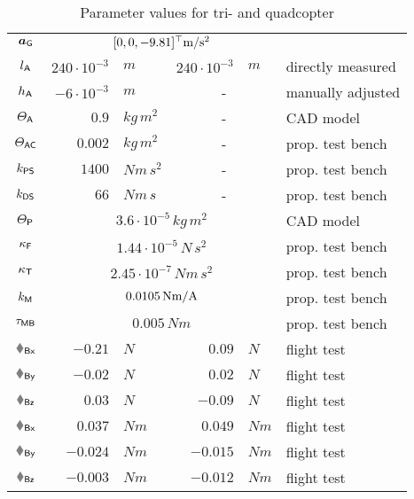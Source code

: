 \begin{table}
\begin{tabular}{crlrll}
  \\[1ex]
  $\boldsymbol{a}_{\mathsf{G}}$ & \multicolumn{4}{c}{$[0, 0, -9.81]^\top \text{m} / \text{s}^2$} & 
  \\[1ex]
  $l_{\mathsf{A}}$ & $ 240 \cdot 10^{-3}$&$\unit{m}$ & $240 \cdot 10^{-3}$&$\unit{m}$ & directly measured \\
  $h_{\mathsf{A}}$ & $  -6 \cdot 10^{-3}$&$\unit{m}$ & \multicolumn{2}{c}{-} & manually adjusted
  \\[1ex]
  $\varTheta_{\mathsf{A}}$  & $ 0.9$&$\unit{kg}\,\unit{m}^2$ & \multicolumn{2}{c}{-} & CAD model \\
  $\varTheta_{\mathsf{AC}}$ & $ 0.002$&$\unit{kg}\,\unit{m}^2$ & \multicolumn{2}{c}{-} & prop. test bench \\
  $k_{\mathsf{PS}}$ & $ 1400 $&$\unit{Nm}\,\unit{s}^2$ & \multicolumn{2}{c}{-} & prop. test bench\\
  $k_{\mathsf{DS}}$ & $ 66$&$\unit{Nm}\,\unit{s}$ & \multicolumn{2}{c}{-} & prop. test bench
  \\[1ex] 
  $\varTheta_{\mathsf{P}}$  & \multicolumn{4}{c}{$3.6 \cdot 10^{-5}\,\unit{kg}\,\unit{m}^2$} & CAD model \\
  $\kappa_{\mathsf{F}}$ & \multicolumn{4}{c}{$1.44 \cdot 10^{-5}\,\unit{N}\,\unit{s}^2$} & prop. test bench \\
  $\kappa_{\mathsf{T}}$ & \multicolumn{4}{c}{$2.45 \cdot 10^{-7}\,\unit{N}\unit{m}\,\unit{s}^2$} & prop. test bench \\
  $k_{\mathsf{M}}$ & \multicolumn{4}{c}{$0.0105\,\text{N}\text{m} / \text{A}$} & prop. test bench \\
  $\tau_{\mathsf{MB}}$ & \multicolumn{4}{c}{$0.005\,\unit{N}\unit{m}$} & prop. test bench
  \\[1ex]
  $\FBx$ & $-0.21$&$\unit{N}$ & $ 0.09$&$\unit{N}$ & flight test \\
  $\FBy$ & $-0.02$&$\unit{N}$ & $ 0.02$&$\unit{N}$ & flight test \\
  $\FBz$ & $ 0.03$&$\unit{N}$ & $ -0.09$&$\unit{N}$ & flight test \\
  $\tauBx$ & $ 0.037$&$\unit{N}\unit{m}$ & $ 0.049$&$\unit{N}\unit{m}$ & flight test \\
  $\tauBy$ & $-0.024$&$\unit{N}\unit{m}$ & $-0.015$&$\unit{N}\unit{m}$ & flight test \\
  $\tauBz$ & $-0.003$&$\unit{N}\unit{m}$ & $-0.012$&$\unit{N}\unit{m}$ & flight test \\
  \bottomrule
 \end{tabular}
 \caption{Parameter values for tri- and quadcopter}
 \label{tab:ParamTriQuad}
\end{table}

